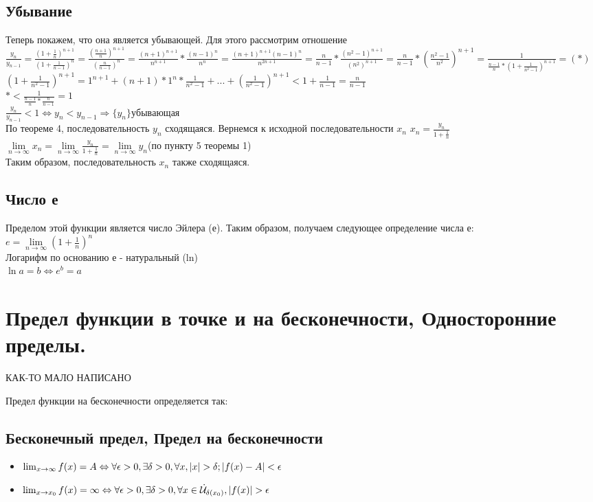 \documentclass[oneside]{book}
\begin{document}
\begin{enumerate}
\section{Убывание}
Теперь покажем, что она является убывающей. Для этого рассмотрим отношение
$\frac{y_n}{y_{n-1}}=\frac{(1+\frac{1}{n})^{n+1}}{(1+\frac{1}{n-1})^n}=\frac{(\frac{n+1}{n})^{n+1}}{(\frac{n}{n-1})^n}=\frac{(n+1)^{n+1}}{n^{n+1}}*\frac{(n-1)^n}{n^n}=\frac{(n+1)^{n+1}(n-1)^{n}}{n^{2n+1}}=\frac{n}{n-1}*\frac{(n^2-1)^{n+1}}{(n^2)^{n+1}}=\frac{n}{n-1}*(\frac{n^2-1}{n^2})^{n+1}=\frac{1}{\frac{n-1}{n}*(1+\frac{1}{n^2-1})^{n+1}}=(*)$\\
$(1+\frac{1}{n^2-1})^{n+1}=1^{n+1}+(n+1)*1^n*\frac{1}{n^2-1}+...+(\frac{1}{n^2-1})^{n+1}<1+\frac{1}{n-1}=\frac{n}{n-1}$\\
$*<\frac{1}{\frac{n-1}{n}*\frac{n}{n-1}}=1$
\\$\frac{y_n}{y_{n-1}}<1\Leftrightarrow y_n<y_{n-1} \Rightarrow \{y_n\} убывающая$
\\По теореме 4, последовательность $y_n$ сходящаяся. Вернемся к исходной последовательности $x_n$
$x_n=\frac{y_n}{1+\frac{1}{n}}$\\
$\lim \limits_{n\rightarrow \infty}x_n=\lim \limits_{n\rightarrow \infty}\frac{y_n}{1+\frac{1}{n}}=\lim \limits_{n\rightarrow \infty}y_n$(по пункту 5 теоремы 1)\\
Таким образом, последовательность $x_n$ также сходящаяся.
\section{Число е}
Пределом этой функции является число Эйлера (е).
Таким образом, получаем следующее определение числа е:\\
$e=\lim \limits_{n\rightarrow \infty}(1+\frac{1}{n})^n$
\\Логарифм по основанию е - натуральный (ln)\\
$\ln a = b \Leftrightarrow e^b=a$

\chapter{Предел функции в точке и на бесконечности, Односторонние пределы.}

{\LARGE КАК-ТО МАЛО НАПИСАНО}

Предел функции на бесконечности определяется так:
\section{Бесконечный предел, Предел на бесконечности}
\begin{itemize}
	\item $\lim_{x \rightarrow \infty}{f(x)} = A \Leftrightarrow \\ \forall \epsilon > 0, \exists \delta > 0,
	\forall x, |x| > \delta; |f(x) - A| < \epsilon$
	\item $\lim_{x \rightarrow x_0}{f(x)} = \infty \Leftrightarrow \\ \forall \epsilon > 0, \exists \delta > 0,
	\forall x \in \dot{\mathcal{U}}_{\delta(x_0)}, |f(x)| > \epsilon$
\end{itemize}


\end{enumerate}
\end{document}
